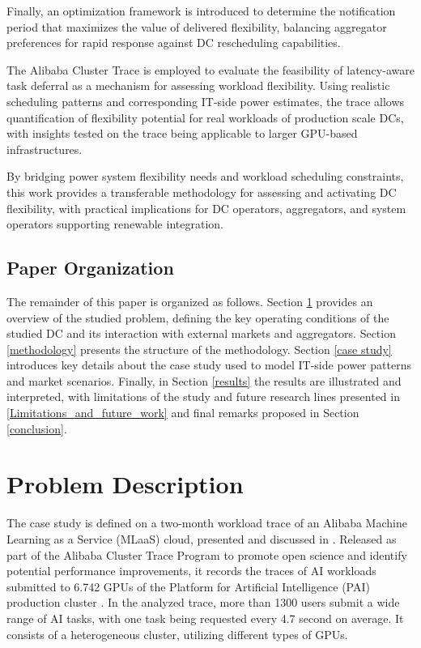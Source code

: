 \documentclass[preprint,12pt]{elsarticle}
\begin{document}
Finally, an optimization framework is introduced to determine the notification period that maximizes the value of delivered flexibility, balancing aggregator preferences for rapid response against DC rescheduling capabilities.

The Alibaba Cluster Trace is employed to evaluate the feasibility of latency-aware task deferral as a mechanism for assessing workload flexibility. Using realistic scheduling patterns and corresponding IT-side power estimates, the trace allows quantification of flexibility potential for real workloads of production scale DCs, with insights tested on the trace being applicable to larger GPU-based infrastructures.

By bridging power system flexibility needs and workload scheduling constraints, this work provides a transferable methodology for assessing and activating DC flexibility, with practical implications for DC operators, aggregators, and system operators supporting renewable integration.

\subsection{Paper Organization}
The remainder of this paper is organized as follows. Section \ref{problem_description} provides an overview of the studied problem, defining the key operating conditions of the studied DC and its interaction with external markets and aggregators. Section \ref{methodology} presents the structure of the methodology. Section \ref{case study} introduces key details about the case study used to model IT-side power patterns and market scenarios. Finally, in Section \ref{results} the results are illustrated and interpreted, with limitations of the study and future research lines presented in \ref{Limitations_and_future_work} and final remarks proposed in Section \ref{conclusion}.


\section{Problem Description}\label{problem_description}

The case study is defined on a two-month workload trace of an Alibaba Machine Learning as a Service (MLaaS) cloud, presented and discussed in \cite{Weng2022}. Released as part of the Alibaba Cluster Trace Program \cite{alibaba2021clusterdata} to promote open science and identify potential performance improvements, it records the traces of AI workloads submitted to 6.742 GPUs of the Platform for Artificial Intelligence (PAI) production cluster \cite{alibaba2021mlplatform}. In the analyzed trace, more than 1300 users submit a wide range of AI tasks, with one task being requested every 4.7 second on average. It consists of a heterogeneous cluster, utilizing different types of GPUs. 
\end{document}
